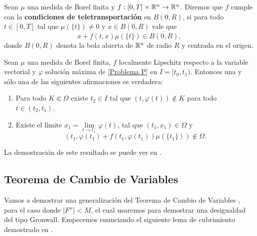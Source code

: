  \begin{defi} 
 	Sean $\mu$ una medida de Borel finita y  $f:[0,T]\times\mathbb{R}^n\to\mathbb{R}^n$. Diremos que $f$ cumple con la \textbf{condiciones de teletransportación} en  $\overline{B(0,R)}$, si  para todo $t\in[0,T]$ tal que $\mu(\{t\})\neq0$ y $x\in\overline{ B(0,R)}$ vale que 
 	\begin{equation*}
 		x+f(t, x)\mu(\{t\}) \in \overline{B(0,R)}, \label{fun-tele}
 	\end{equation*}
 	donde $B(0,R)$ denota la bola abierta de $\mathbb{R}^n$ de radio $R$ y centrada en el origen.
 \end{defi}

\begin{thm}	\label{th:extensión}
	Sean $\mu$ una medida de Borel finita, $f$ localmente Lipschitz respecto a la variable vectorial y $\varphi$  solución máxima de \eqref{Problema P} en $I=[t_0,t_1)$. Entonces una y sólo una de las siguientes afirmaciones es verdadera: 
	\begin{enumerate}[label=\upshape(\Roman*)]
		\item  Para todo $K\Subset\Omega$ existe $t_2\in I$ tal que $(t,\varphi(t))\notin K$ para todo $t\in(t_2,t_1)$.
		\item Existe el límite $x_1=\lim\limits_{t\to t_1^-}\varphi(t)$, tal que  $(t_1,x_1)\in\Omega$ y 
		$$\left( t_1 ,\varphi(t_1)+f(t_1,\varphi(t_1))\mu(\{t_1\})\right) \notin \Omega.$$
	
	\end{enumerate}
\end{thm}
La demostración de este resultado se puede ver en \cite[Teorema 5.5]{P.Mazzone}.

















\subsection{Teorema de Cambio de Variables}


Vamos a demostrar una generalización del Teorema de Cambio de Variables \cite[Teorema 6.1]{P.Mazzone}, para el caso donde $|F''|<M$, el cual usaremos para demostrar una desigualdad del tipo Gronwall.  
Empecemos enunciando el siguiente lema de cubrimiento demostrado en \cite[Corolario I, p 35]{Evans}.

